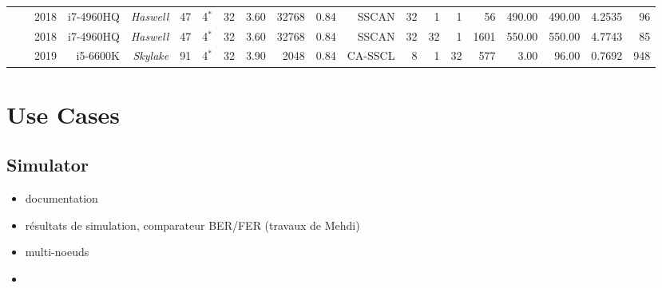 \begin{table}
\begin{adjustbox}{angle=90}
{{\begin{tabular}{|r|r r|r r r r r r|r r|r r r r|r r|r r r|}
                                                                 & \cite{LeGal2017a}    & 2018          & i7-4960HQ          & \textit{Haswell}   &          47  &  4$^*$         &  32           & 3.60           & 32768    & 0.84     &      SSCAN         & 32            &    1             &  1                &      56           &  490.00          &  490.00       &  4.2535        &     96             \\
                                                                 & \cite{LeGal2017a}    & 2018          & i7-4960HQ          & \textit{Haswell}   &          47  &  4$^*$         &  32           & 3.60           & 32768    & 0.84     &      SSCAN         & 32            &   32             &  1                &    1601           &  550.00          &  550.00       &  4.7743        &     85             \\
                                                                 & \cite{Leonardon2019} & 2019          & i5-6600K           & \textit{Skylake}   &          91  &  4$^*$         &  32           & 3.90           &  2048    & 0.84     &   CA-SSCL          &  8            &    1             & 32                &     577           &    3.00          &   96.00       &  0.7692        &    948             \\

  \hline
  \end{tabular}
  }}
  \end{adjustbox}
\end{table}

\section{Use Cases}

\subsection{Simulator}

\begin{itemize}
  \item documentation
  \item résultats de simulation, comparateur BER/FER (travaux de Mehdi)
  \item multi-noeuds
  \item \cite{Cassagne2017,Cassagne2017a}
\end{itemize}

